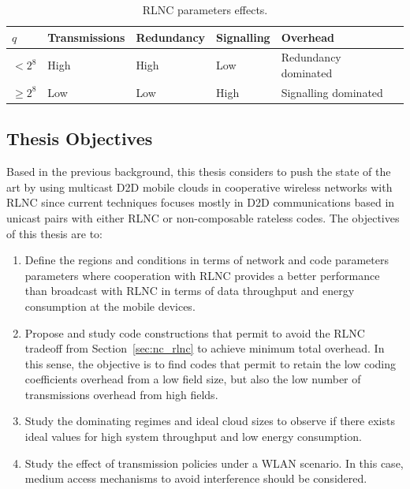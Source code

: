\begin{table}[h]
  \centering
  \caption{RLNC parameters effects.}
  \begin{tabular}{|M{0.75cm}|M{2.15cm}|M{2cm}|M{2.0cm}|M{2.0cm}|M{2.0cm}}

    \hline
    $q$ & Transmissions & Redundancy & Signalling & Overhead  \\
    \hline
    \hline
    $< 2^8$     & High & High & Low  & Redundancy dominated \\
    \hline
    $\geq 2^8$  & Low  & Low  & High & Signalling dominated \\
    \hline

  \end{tabular}

\vspace{0.2cm}
\label{tab:rlnc_parameters}
\end{table}

\subsection{Thesis Objectives}
Based in the previous background, this thesis considers to push the state of the art by using multicast \ac{D2D} mobile clouds in cooperative wireless networks with \ac{RLNC} since current techniques focuses mostly in \ac{D2D} communications based in unicast pairs with either \ac{RLNC} or non-composable rateless codes. The objectives of this thesis are to:

\begin{enumerate}

\item Define the regions and conditions in terms of network and code parameters parameters where cooperation with \ac{RLNC} provides a better performance than broadcast with \ac{RLNC} in terms of data throughput and energy consumption at the mobile devices.

\item Propose and study code constructions that permit to avoid the \ac{RLNC} tradeoff from Section~\ref{sec:nc_rlnc} to achieve minimum total overhead. In this sense, the objective is to find codes that permit to retain the low coding coefficients overhead from a low field size, but also the low number of transmissions overhead from high fields.

\item Study the dominating regimes and ideal cloud sizes to observe if there exists ideal values for high system throughput and low energy consumption.

\item Study the effect of transmission policies under a \ac{WLAN} scenario. In this case, medium access mechanisms to avoid interference should be considered.
\end{enumerate}

